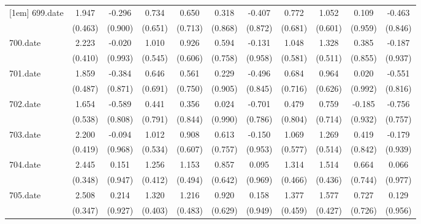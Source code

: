 \begin{tabular}{l*{10}{c}}
[1em]
699.date    &       1.947&      -0.296&       0.734&       0.650&       0.318&      -0.407&       0.772&       1.052&       0.109&      -0.463\\
            &     (0.463)&     (0.900)&     (0.651)&     (0.713)&     (0.868)&     (0.872)&     (0.681)&     (0.601)&     (0.959)&     (0.846)\\
[1em]
700.date    &       2.223&      -0.020&       1.010&       0.926&       0.594&      -0.131&       1.048&       1.328&       0.385&      -0.187\\
            &     (0.410)&     (0.993)&     (0.545)&     (0.606)&     (0.758)&     (0.958)&     (0.581)&     (0.511)&     (0.855)&     (0.937)\\
[1em]
701.date    &       1.859&      -0.384&       0.646&       0.561&       0.229&      -0.496&       0.684&       0.964&       0.020&      -0.551\\
            &     (0.487)&     (0.871)&     (0.691)&     (0.750)&     (0.905)&     (0.845)&     (0.716)&     (0.626)&     (0.992)&     (0.816)\\
[1em]
702.date    &       1.654&      -0.589&       0.441&       0.356&       0.024&      -0.701&       0.479&       0.759&      -0.185&      -0.756\\
            &     (0.538)&     (0.808)&     (0.791)&     (0.844)&     (0.990)&     (0.786)&     (0.804)&     (0.714)&     (0.932)&     (0.757)\\
[1em]
703.date    &       2.200&      -0.094&       1.012&       0.908&       0.613&      -0.150&       1.069&       1.269&       0.419&      -0.179\\
            &     (0.419)&     (0.968)&     (0.534)&     (0.607)&     (0.757)&     (0.953)&     (0.577)&     (0.514)&     (0.842)&     (0.939)\\
[1em]
704.date    &       2.445&       0.151&       1.256&       1.153&       0.857&       0.095&       1.314&       1.514&       0.664&       0.066\\
            &     (0.348)&     (0.947)&     (0.412)&     (0.494)&     (0.642)&     (0.969)&     (0.466)&     (0.436)&     (0.744)&     (0.977)\\
[1em]
705.date    &       2.508&       0.214&       1.320&       1.216&       0.920&       0.158&       1.377&       1.577&       0.727&       0.129\\
            &     (0.347)&     (0.927)&     (0.403)&     (0.483)&     (0.629)&     (0.949)&     (0.459)&     (0.427)&     (0.726)&     (0.956)\\

\end{tabular}
